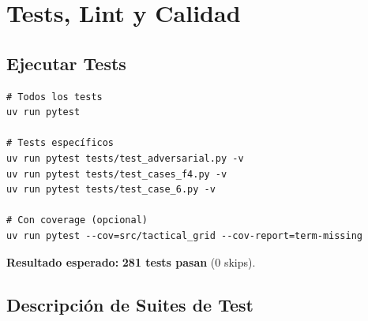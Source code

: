 \chapter{Tests, Lint y Calidad}
\label{man:tests}

\section{Ejecutar Tests}
\label{sec:ejecutar-tests}

\begin{verbatim}
# Todos los tests
uv run pytest

# Tests específicos
uv run pytest tests/test_adversarial.py -v
uv run pytest tests/test_cases_f4.py -v
uv run pytest tests/test_case_6.py -v

# Con coverage (opcional)
uv run pytest --cov=src/tactical_grid --cov-report=term-missing
\end{verbatim}

\textbf{Resultado esperado:} \textbf{281 tests pasan} (0 skips).


\section{Descripción de Suites de Test}
\label{sec:suites-tests}

